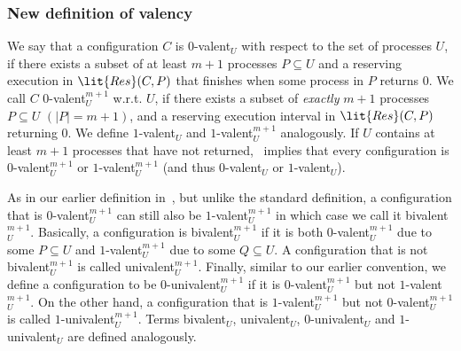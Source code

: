 \subsubsection{New definition of valency}
We say that a configuration $C$ is $0$-valent$_U$ with respect to the set of processes $U$,
  if there exists a subset of at least $m+1$ processes $P \subseteq U$ and a reserving execution in $\lit{Res}(C, P)$ 
  that finishes when some process in $P$ returns $0$.
We call $C$ $0$-valent$_U^{m+1}$ w.r.t. $U$, 
  if there exists a subset of \emph{exactly} $m+1$ processes $P \subseteq U$ $(|P| = m+1)$,
  and a reserving execution interval in $\lit{Res}(C, P)$ returning $0$. 
We define $1$-valent$_U$ and $1$-valent$_U^{m+1}$ analogously.
If $U$ contains at least $m+1$ processes that have not returned,~ implies that 
  every configuration is $0$-valent$_U^{m+1}$ or $1$-valent$_U^{m+1}$ (and thus $0$-valent$_U$ or $1$-valent$_U$).



As in our earlier definition in~, but unlike the standard definition,
  a configuration that is $0$-valent$_U^{m+1}$ can still also be $1$-valent$_U^{m+1}$
  in which case we call it bivalent$_U^{m+1}$.
Basically, a configuration is bivalent$_U^{m+1}$ if it is both 
  $0$-valent$_U^{m+1}$ due to some $P \subseteq U$ and 
  $1$-valent$_U^{m+1}$ due to some $Q \subseteq U$.
A configuration that is not bivalent$_U^{m+1}$ is called univalent$_U^{m+1}$.
Finally, similar to our earlier convention,
  we define a configuration to be $0$-univalent$_U^{m+1}$ if it is $0$-valent$_U^{m+1}$ but not $1$-valent$_U^{m+1}$.
On the other hand, a configuration that is $1$-valent$_U^{m+1}$ but not $0$-valent$_U^{m+1}$
  is called $1$-univalent$_U^{m+1}$.
Terms bivalent$_U$, univalent$_U$, $0$-univalent$_U$ and $1$-univalent$_U$ are defined analogously.

